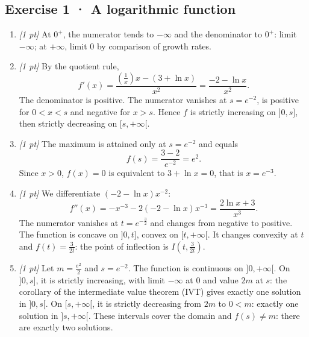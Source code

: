 \subsection*{Exercise 1 · A logarithmic function}\begin{enumerate}

\item \textit{[1 pt]} At $0^+$, the numerator tends to $-\infty$ and the denominator to $0^+$: limit $-\infty$; at $+\infty$, limit $0$ by comparison of growth rates.

\item \textit{[1 pt]} By the quotient rule,
\[f'(x)=\frac{(\frac{1}{x})x-(3+\ln x)}{x^2}=\frac{-2-\ln x}{x^2}.\]
The denominator is positive. The numerator vanishes at $s=e^{-2}$, is positive for $0<x<s$ and negative for $x>s$. Hence $f$ is strictly increasing on $]0,s]$, then strictly decreasing on $[s,+\infty[$.

\item \textit{[1 pt]} The maximum is attained only at $s=e^{-2}$ and equals
\[f(s)=\frac{3- 2}{e^{-2}}=e^{2}.\]
Since $x>0$, $f(x)=0$ is equivalent to $3+\ln x=0$, that is $x=e^{-3}$.

\item \textit{[1 pt]} We differentiate $(-2-\ln x)x^{-2}$:
\[f''(x)=-x^{-3}-2(-2-\ln x)x^{-3}=\frac{2\ln x+3}{x^3}.\]
The numerator vanishes at $t=e^{-\frac{3}{2}}$ and changes from negative to positive. The function is concave on $]0,t]$, convex on $[t,+\infty[$. It changes convexity at $t$ and $f(t)=\frac{3}{2t}$: the point of inflection is $I(t,\frac{3}{2t})$.

\item \textit{[1 pt]} Let $m=\frac{e^{2}}{2}$ and $s=e^{-2}$. The function is continuous on $]0,+\infty[$. On $]0,s]$, it is strictly increasing, with limit $-\infty$ at $0$ and value $2m$ at $s$: the corollary of the intermediate value theorem (IVT) gives exactly one solution in $]0,s[$. On $[s,+\infty[$, it is strictly decreasing from $2m$ to $0<m$: exactly one solution in $]s,+\infty[$. These intervals cover the domain and $f(s)\ne m$: there are exactly two solutions.

\end{enumerate}

